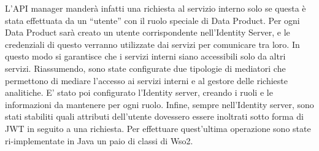 \documentclass[12pt]{report}
\begin{document}
L'API manager manderà infatti una richiesta al servizio interno solo se questa è stata effettuata da un ``utente'' con il ruolo speciale di Data Product.
Per ogni Data Product sarà creato un utente corrispondente nell'Identity Server, e le credenziali di questo verranno utilizzate dai servizi per comunicare tra loro.
In questo modo si garantisce che i servizi interni siano accessibili solo da altri servizi.
Riassumendo, sono state configurate due tipologie di mediatori che permettono di mediare l'accesso ai servizi interni e al gestore delle richieste analitiche.
E' stato poi configurato l'Identity server, creando i ruoli e le informazioni da mantenere per ogni ruolo.
Infine, sempre nell'Identity server, sono stati stabiliti quali attributi dell'utente dovessero essere inoltrati sotto forma di JWT in seguito a una richiesta.
Per effettuare quest'ultima operazione sono state ri-implementate in Java un paio di classi di Wso2.
\end{document}
